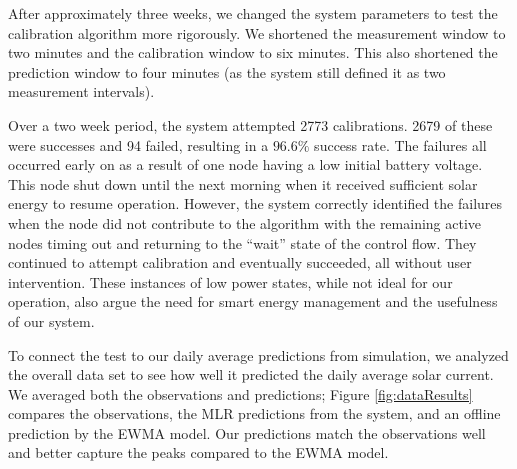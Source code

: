 \documentclass[prodmode,acmtosn]{acmsmall}
\begin{document}
After approximately three weeks, we changed the system parameters to test the calibration algorithm more rigorously.
We shortened the measurement window to two minutes and the calibration window to six minutes.
This also shortened the prediction window to four minutes (as the system still defined it as two measurement intervals).

Over a two week period, the system attempted 2773 calibrations.
2679 of these were successes and 94 failed, resulting in a $96.6\%$ success rate.
The failures all occurred early on as a result of one node having a low initial battery voltage.
This node shut down until the next morning when it received sufficient solar energy to resume operation.
However, the system correctly identified the failures when the node did not contribute to the algorithm with the remaining active nodes timing out and returning to the ``wait'' state of the control flow.
They continued to attempt calibration and eventually succeeded, all without user intervention.
These instances of low power states, while not ideal for our operation, also argue the need for smart energy management and the usefulness of our system.

To connect the test to our daily average predictions from simulation, we analyzed the overall data set to see how well it predicted the daily average solar current.
We averaged both the observations and predictions; Figure \ref{fig:dataResults} compares the observations, the MLR predictions from the system, and an offline prediction by the EWMA model.
Our predictions match the  observations well and better capture the peaks compared to the EWMA model.

\begin{table}[htb]
\centering
{}
\end{table}
\end{document}
